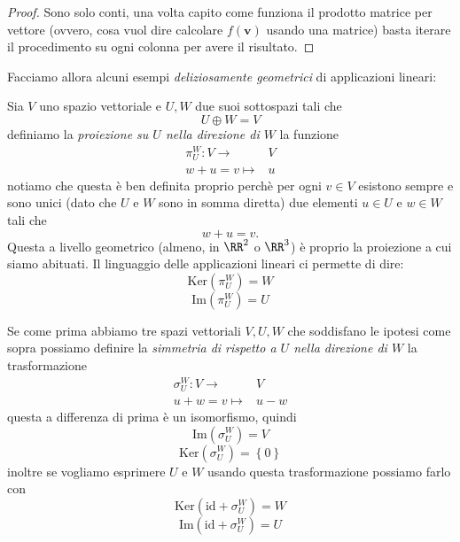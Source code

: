 \documentclass[11pt]{scrartcl}
\newcommand{\Immagine}[1]{\text{Im}\left(#1\right)}
\renewcommand{\ker}[1]{\text{Ker}\left(#1\right)}
\begin{document}
 	 \begin{proof}
 	 	Sono solo conti, una volta capito come funziona il prodotto matrice per vettore (ovvero, cosa vuol dire calcolare $f(\mathbf{v})$ usando una matrice) basta iterare il procedimento su ogni colonna per avere il risultato.
 	 \end{proof}
 	 Facciamo allora alcuni esempi \textit{deliziosamente geometrici} di applicazioni lineari:
 	 \begin{example}[Proiezioni]
 	 	Sia $V$ uno spazio vettoriale e $U,W$ due suoi sottospazi tali che
 	 	$$U\oplus W=V$$
 	 	definiamo la \textit{proiezione su $U$ nella direzione di $W$} la funzione
 	 	\begin{align*}
 	 		\pi_U^W:V\to & V \\
 	 		w+u=v\mapsto & u
 	 	\end{align*}
 	 	notiamo che questa è ben definita proprio perchè per ogni $v\in V$ esistono sempre e sono unici (dato che $U$ e $W$ sono in somma diretta) due elementi $u\in U$ e $w\in W$ tali che 
 	 	$$w+u=v.$$
 	 	Questa a livello geometrico (almeno, in $\RR^2$ o $\RR^3$) è proprio la proiezione a cui siamo abituati. Il linguaggio delle applicazioni lineari ci permette di dire:
 	 	$$\ker{\pi_U^W}=W$$
 	 	$$\Immagine{\pi_U^W}=U$$
 	 \end{example}
 	 \begin{example}[Simmetrie]
 	 	Se come prima abbiamo tre spazi vettoriali $V,U,W$ che soddisfano le ipotesi come sopra possiamo definire la \textit{simmetria di rispetto a $U$ nella direzione di $W$} la trasformazione
 	 	\begin{align*}
 	 		\sigma_U^W:V\to & V \\
 	 		u+w=v\mapsto & u-w
 	 	\end{align*}
 	 	questa a differenza di prima è un isomorfismo, quindi 
 	 	$$\Immagine{\sigma_U^W}=V$$
 	 	$$\ker{\sigma_U^W}=\left\{0\right\}$$
 	 	inoltre se vogliamo esprimere $U$ e $W$ usando questa trasformazione possiamo farlo con
 	 	$$\ker{\text{id}+\sigma_U^W}=W$$
 	 	$$\Immagine{\text{id}+\sigma_U^W}=U$$
  	 \end{example}
  	 
\end{document}

